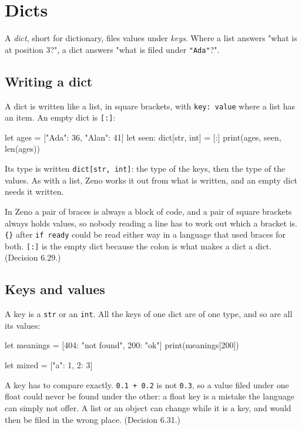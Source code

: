 \chapter{Dicts}\label{ch-dicts}

A \emph{dict}, short for dictionary, files values under \emph{keys}.
Where a list answers "what is at position 3?", a dict answers "what is
filed under \verb|"Ada"|?".

\section{Writing a dict}

A dict is written like a list, in square brackets, with
\verb|key: value| where a list has an item. An empty dict is
\verb|[:]|:

\begin{zeno}
let ages = ["Ada": 36, "Alan": 41]
let seen: dict[str, int] = [:]
print(ages, seen, len(ages))
\end{zeno}

Its type is written \verb|dict[str, int]|: the type of the keys, then
the type of the values. As with a list, Zeno works it out from what is
written, and an empty dict needs it written.

\begin{why}
In Zeno a pair of braces is always a block of code, and a pair of
square brackets always holds values, so nobody reading a line has to
work out which a bracket is. \verb|{}| after \verb|if ready| could be
read either way in a language that used braces for both. \verb|[:]| is
the empty dict because the colon is what makes a dict a dict.
(Decision 6.29.)
\end{why}

\section{Keys and values}

A key is a \verb|str| or an \verb|int|. All the keys of one dict are
of one type, and so are all its values:

\begin{zeno}
let meanings = [404: "not found", 200: "ok"]
print(meanings[200])
\end{zeno}

\begin{zeno}[fails=yes]
let mixed = ["a": 1, 2: 3]
\end{zeno}

\begin{why}
A key has to compare exactly. \verb|0.1 + 0.2| is not \verb|0.3|, so a
value filed under one float could never be found under the other: a
float key is a mistake the language can simply not offer. A list or an
object can change while it is a key, and would then be filed in the
wrong place. (Decision 6.31.)
\end{why}

